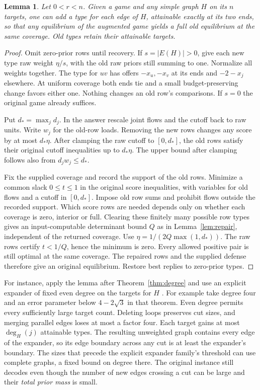 \documentclass[11pt,oneside,openany,notitlepage]{report}
\newtheorem{lemma}[theorem]{Lemma}
\begin{document}
\begin{lemma}\label{lem:overlay}
Let \(0<r<n\). Given a game and any simple graph \(H\) on its \(n\)
targets, one can add a type for each edge of \(H\), attainable exactly at
its two ends, so that any equilibrium of the augmented game yields a full
old equilibrium at the \emph{same coverage}. Old types retain their
attainable targets.
\end{lemma}
\begin{proof}
Omit zero-prior rows until recovery. If \(s=|E(H)|>0\), give each new
type raw weight \(\eta/s\), with the old raw priors still summing to one.
Normalize all weights together. The type for \(uv\) has offers
\(-x_u,-x_v\) at its ends and \(-2-x_j\) elsewhere. At uniform coverage
both ends tie and a small budget-preserving change favors either one.
Nothing changes an old row's comparisons. If \(s=0\) the original game
already suffices.

Put \(d_*=\max_j d_j\). In the answer rescale joint flows and the cutoff
back to raw units. Write \(w_j\) for the old-row loads. Removing the new
rows changes any score by at most \(d_*\eta\). After clamping the raw
cutoff to \([0,d_*]\), the old rows satisfy their original cutoff
inequalities up to \(d_*\eta\). The upper bound after clamping follows
also from \(d_jw_j\le d_*\).

Fix the supplied coverage and record the support of the old rows.
Minimize a common slack \(0\le t\le1\) in the original score inequalities,
with variables for old flows and a cutoff in \([0,d_*]\). Impose old row
sums and prohibit flows outside the recorded support. Which score rows
are needed depends only on whether each coverage is zero, interior or
full. Clearing these finitely many possible row types gives an
input-computable determinant bound \(Q\) as in Lemma~\ref{lem:repair},
independent of the returned coverage. Use
\(\eta=1/(2Q\max(1,d_*))\). The raw rows certify \(t<1/Q\), hence the
minimum is zero. Every allowed positive pair is still optimal at the
same coverage. The repaired rows and the supplied defense therefore
give an original equilibrium. Restore best replies to zero-prior types.
\end{proof}

For instance, apply the lemma after Theorem~\ref{thm:degree} and use an
explicit expander of fixed even degree on the targets for \(H\)
\cite[Theorem~1.3]{alon}. For example take degree four and an error parameter below
\(4-2\sqrt{3}\) in that theorem. Even degree permits every sufficiently
large target count. Deleting loops preserves cut sizes, and merging
parallel edges loses at most a factor four. Each target gains at most \(\deg_H(j)\) attainable types.
The resulting unweighted graph contains every edge of the expander, so
its edge boundary across any cut is at least the expander's boundary.
The sizes that precede the explicit expander family's threshold can use
complete graphs, a fixed bound on degree there. The original instance
still decodes even though the number of new edges crossing a cut can be
large and their \emph{total prior mass} is small.
\end{document}
